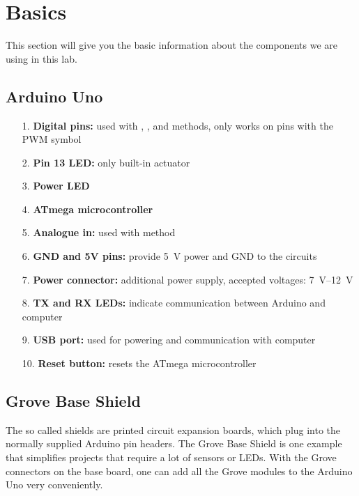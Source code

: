 \newpage
\section{Basics}
This section will give you the basic information about the components we are using in this lab.

\subsection{Arduino Uno}\label{sec:uno}

\begin{itemize}
	\item[1.] \textbf{Digital pins:} 			used with , , and  methods,  only works on pins with the \ac{PWM} symbol
	\item[2.] \textbf{Pin 13 LED:} 				only built-in actuator
	\item[3.] \textbf{Power LED}
	\item[4.] \textbf{ATmega microcontroller}
	\item[5.] \textbf{Analogue in:} 			used with  method
	\item[6.] \textbf{GND and 5V pins:} 	provide \SI[retain-explicit-plus]{5}{\volt} power and \ac{GND} to the circuits
	\item[7.] \textbf{Power connector:} 	additional power supply, accepted voltages: \SIrange{7}{12}{\volt}
	\item[8.] \textbf{TX and RX LEDs:} 		indicate communication between Arduino and computer
	\item[9.] \textbf{USB port:} used 		for powering and communication with computer
	\item[10.] \textbf{Reset button:}			resets the ATmega microcontroller
\end{itemize}

\subsection{Grove Base Shield}\label{sec:grove}
The so called shields are printed circuit expansion boards, which plug into the normally supplied Arduino pin headers. The Grove Base Shield is one example that simplifies projects that require a lot of sensors or LEDs. With the Grove connectors on the base board, one can add all the Grove modules to the Arduino Uno very conveniently.\par

